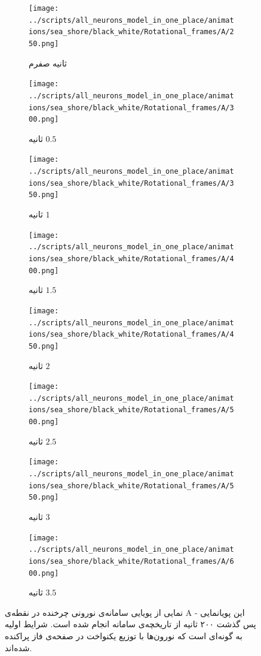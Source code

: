 \begin{figure}
	\begin{subfigure}{0.5\textwidth}
		\texttt{[image: ../scripts/all\_neurons\_model\_in\_one\_place/animations/sea\_shore/black\_white/Rotational\_frames/A/250.png]}
		\caption{
			ثانیه صفرم		
		}
	\end{subfigure}
	\begin{subfigure}{0.5\textwidth}
		\texttt{[image: ../scripts/all\_neurons\_model\_in\_one\_place/animations/sea\_shore/black\_white/Rotational\_frames/A/300.png]}
		\caption{
			ثانیه $0.5$
		}
	\end{subfigure}
	\begin{subfigure}{0.5\textwidth}
		\texttt{[image: ../scripts/all\_neurons\_model\_in\_one\_place/animations/sea\_shore/black\_white/Rotational\_frames/A/350.png]}
		\caption{
			ثانیه $1$		
		}
	\end{subfigure}
	\begin{subfigure}{0.5\textwidth}
		\texttt{[image: ../scripts/all\_neurons\_model\_in\_one\_place/animations/sea\_shore/black\_white/Rotational\_frames/A/400.png]}
		\caption{
			ثانیه $1.5$
		}
	\end{subfigure}
	\begin{subfigure}{0.5\textwidth}
		\texttt{[image: ../scripts/all\_neurons\_model\_in\_one\_place/animations/sea\_shore/black\_white/Rotational\_frames/A/450.png]}
		\caption{
			ثانیه $2$
		}
	\end{subfigure}
	\begin{subfigure}{0.5\textwidth}
		\texttt{[image: ../scripts/all\_neurons\_model\_in\_one\_place/animations/sea\_shore/black\_white/Rotational\_frames/A/500.png]}
		\caption{
			ثانیه $2.5$
		}
	\end{subfigure}
	\begin{subfigure}{0.5\textwidth}
		\texttt{[image: ../scripts/all\_neurons\_model\_in\_one\_place/animations/sea\_shore/black\_white/Rotational\_frames/A/550.png]}
		\caption{
			ثانیه $3$
		}
	\end{subfigure}
	\begin{subfigure}{0.5\textwidth}
		\texttt{[image: ../scripts/all\_neurons\_model\_in\_one\_place/animations/sea\_shore/black\_white/Rotational\_frames/A/600.png]}
		\caption{
			ثانیه $3.5$
		}
	\end{subfigure}
	\caption{
		نمایی از پویایی سامانه‌ی نورونی چرخنده در نقطه‌ی A - این پویانمایی پس گذشت ۲۰۰ ثانیه از تاریخچه‌ی سامانه انجام شده است. شرایط اولیه به گونه‌ای است که نورون‌ها با توزیع یکنواخت در صفحه‌ی فاز پراکنده شده‌اند.	
	}
	\label{fig:rotational_animation_A}
\end{figure}
\restoregeometry 

